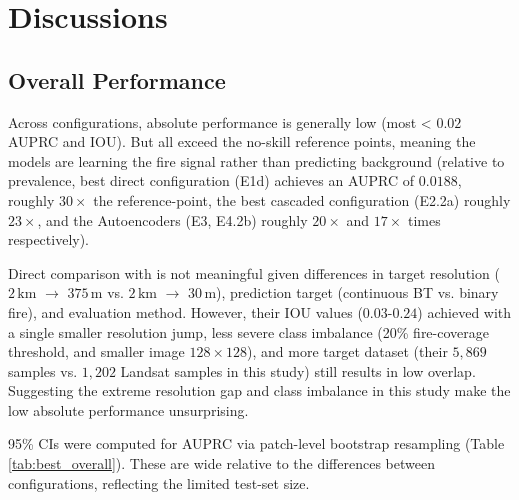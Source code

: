 \documentclass[a4paper, 11pt]{article} %
\begin{document}

\section{Discussions} \label{sec:discussion}

\subsection{Overall Performance}
Across configurations, absolute performance is generally low (most < $0.02$ AUPRC and IOU). But all exceed the no-skill reference points, meaning the models are learning the fire signal rather than predicting background (relative to prevalence, best direct configuration (E1d) achieves an AUPRC of $0.0188$, roughly $30\times$ the reference-point, the best cascaded configuration (E2.2a) roughly $23\times$, and the Autoencoders (E3, E4.2b) roughly $20\times$ and $17\times$ times respectively).

Direct comparison with \cite{badhanDeepLearningApproach2024} is not meaningful given differences in target resolution ($2\,\text{km}$ $\to$ $375\,\text{m}$ vs. $2\,\text{km}$ $\to$ $30\,\text{m}$), prediction target (continuous BT vs. binary fire), and evaluation method. However, their IOU values ($0.03$-$0.24$) achieved with a single smaller resolution jump, less severe class imbalance (20\% fire-coverage threshold, and smaller image $128 \times 128$), and more target dataset (their $5,869$ samples vs. $1,202$ Landsat samples in this study) still results in low overlap. Suggesting the extreme resolution gap and class imbalance in this study make the low absolute performance unsurprising.

95\% CIs were computed for AUPRC via patch-level bootstrap resampling (Table \ref{tab:best_overall}). These are wide relative to the differences between configurations, reflecting the limited test-set size.
\end{document}
